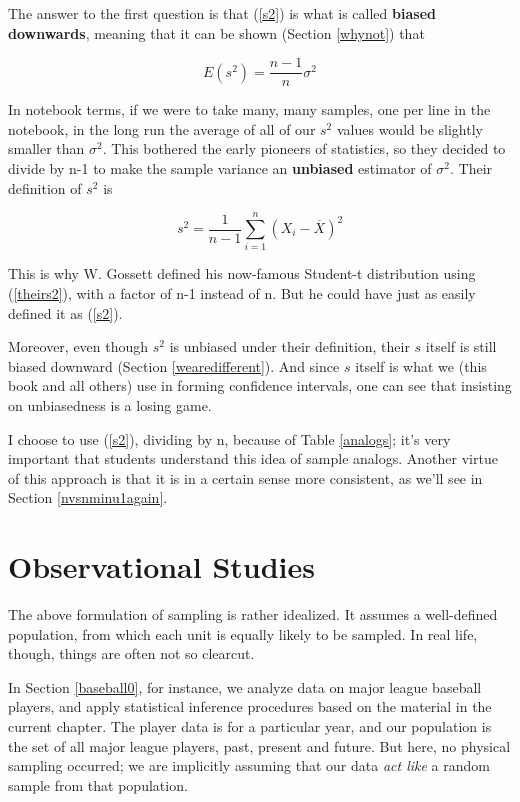 The answer to the first question is that (\ref{s2}) is what is called
{\bf biased downwards}, meaning that it can be shown (Section
\ref{whynot}) that 

\begin{equation}
E(s^2) = \frac{n-1}{n} \sigma^2
\end{equation}

In notebook terms, if we were to take many, many samples, one per line
in the notebook, in the long run the average of all of our $s^2$ values
would be slightly smaller than $\sigma^2$.  This bothered the early
pioneers of statistics, so they decided to divide by n-1 to make the
sample variance an {\bf unbiased} estimator of $\sigma^2$.  Their
definition of $s^2$ is

\begin{equation}
\label{theirs2}
s^2 = \frac{1}{n-1} \sum_{i=1}^{n} (X_i-\overline{X})^2 
\end{equation}

This is why W. Gossett defined his now-famous Student-t distribution using
(\ref{theirs2}), with a factor of n-1 instead of n.  But he could have
just as easily defined it as (\ref{s2}).

Moreover, even though $s^2$ is unbiased under their definition, their $s$
itself is still biased downward (Section \ref{wearedifferent}).  And
since $s$ itself is what we (this book and all others) use in forming
confidence intervals, one can see that insisting on unbiasedness is a
losing game.

I choose to use (\ref{s2}), dividing by n, because of Table
\ref{analogs}; it's very important that students understand this idea of
sample analogs.  Another virtue of this approach is that it is in a
certain sense more consistent, as we'll see in Section
\ref{nvsnminu1again}.

\section{Observational Studies}
\label{observational}

The above formulation of sampling is rather idealized.  It assumes a
well-defined population, from which each unit is equally likely to be
sampled.  In real life, though, things are often not so clearcut.

In Section \ref{baseball0}, for instance, we analyze data on major
league baseball players, and apply statistical inference procedures
based on the material in the current chapter.  The player data is for a
particular year, and our population is the set of all major league
players, past, present and future.  But here, no physical sampling
occurred; we are implicitly assuming that our data {\it act like} a
random sample from that population.  

